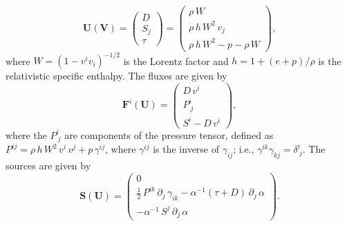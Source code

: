 \documentclass[letterpaper]{jpconf}
\renewcommand{\bs}[1]{\boldsymbol{#1}}
\begin{document}
 \begin{equation}\label{Eq:Prim2Cons}
     \bs{U}\left(\bs{V}\right)=\begin{pmatrix}D\\ S_{j}\\\tau\end{pmatrix}=\begin{pmatrix}\rho\,W\\ \rho\,h\,W^{2}\,v_{j}\\\rho\,h\,W^{2}-p-\rho\,W\end{pmatrix},
 \end{equation}
 where $W=\left(1-v^{i}v_{i}\right)^{-1/2}$ is the Lorentz factor and $h=1+\left(e+p\right)/\rho$ is the relativistic specific enthalpy. The fluxes are given by
 \begin{equation}
     \bs{F}^{i}\left(\bs{U}\right)=\begin{pmatrix}D\,v^{i}\\ P^{i}_{~j}\\ S^{i}-D\,v^{i}\end{pmatrix},
 \end{equation}
 where the $P^{i}_{~j}$ are components of the pressure tensor, defined as $P^{ij}=\rho\,h\,W^{2}\,v^{i}\,v^{j}+p\,\gamma^{ij}$, where $\gamma^{ij}$ is the inverse of $\gamma_{ij}$; i.e., $\gamma^{ik}\gamma_{kj}=\delta^{i}_{~j}$. The sources are given by
 \begin{equation}
     \bs{S}\left(\bs{U}\right)=\begin{pmatrix}0\\\frac{1}{2}\,P^{ik}\,\partial_{j}\,\gamma_{ik}-\alpha^{-1}\left(\tau+D\right)\,\partial_{j}\,\alpha\\-\alpha^{-1}\,S^{j}\,\partial_{j}\,\alpha\end{pmatrix}.
 \end{equation}
\end{document}
